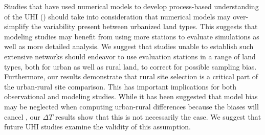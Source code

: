 \documentclass[draft,linenumbers]{agujournal}
\begin{document}
Studies that have used numerical models to develop process-based understanding of the UHI (\citep{zhang2011impact,li2013modeling,li2015contrasting,li2013synergistic}) should take into consideration that numerical models may over-simplify the variability present between urbanized land types. 
This suggests that modeling studies may benefit from using more stations to evaluate simulations as well as more detailed analysis. We suggest that studies unable to establish such extensive networks should endeavor to use evaluation stations in a range of land types, both for urban as well as rural land, to correct for possible sampling bias. 
Furthermore, our results demonstrate that rural site selection is a critical part of the urban-rural site comparison. 
This has important implications for both observational and modeling studies.
While it has been suggested that model bias may be neglected when computing urban-rural differences because the biases will cancel \citep{li2013synergistic}, our $\Delta T$ results show that this is not necessarily the case. 
We suggest that future UHI studies examine the validity of this assumption. 
\end{document}
